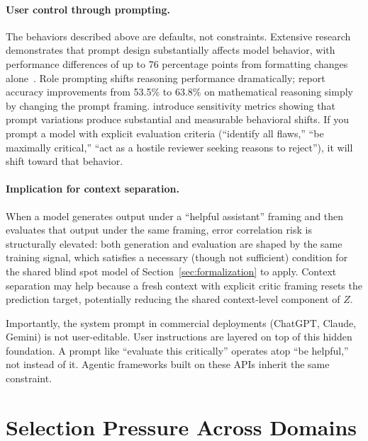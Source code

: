 \documentclass[11pt]{article}
\begin{document}
\paragraph{User control through prompting.} The behaviors described above are defaults, not
constraints. Extensive research demonstrates that prompt design substantially affects model
behavior, with performance differences of up to 76 percentage points from formatting changes
alone~\citep{sclar2024formatting}. Role prompting shifts reasoning performance dramatically;
\citet{kong2023roleplay} report accuracy improvements from 53.5\% to 63.8\% on mathematical
reasoning simply by changing the prompt framing. \citet{zhuo2024prosa} introduce sensitivity
metrics showing that prompt variations produce substantial and measurable behavioral shifts.
If you prompt a model with explicit evaluation criteria (``identify all flaws,'' ``be
maximally critical,'' ``act as a hostile reviewer seeking reasons to reject''), it will shift
toward that behavior.

\paragraph{Implication for context separation.} When a model generates output under a
``helpful assistant'' framing and then evaluates that output under the same framing, error
correlation risk is structurally elevated: both generation and evaluation are shaped by the
same training signal, which satisfies a necessary (though not sufficient) condition for the
shared blind spot model of Section~\ref{sec:formalization} to apply. Context separation may
help because a fresh context with explicit critic framing resets the prediction target,
potentially reducing the shared context-level component of $Z$.

Importantly, the system prompt in commercial deployments (ChatGPT, Claude, Gemini) is not
user-editable. User instructions are layered on top of this hidden foundation. A prompt like
``evaluate this critically'' operates atop ``be helpful,'' not instead of it. Agentic
frameworks built on these APIs inherit the same constraint.

\section{Selection Pressure Across Domains}
\end{document}
